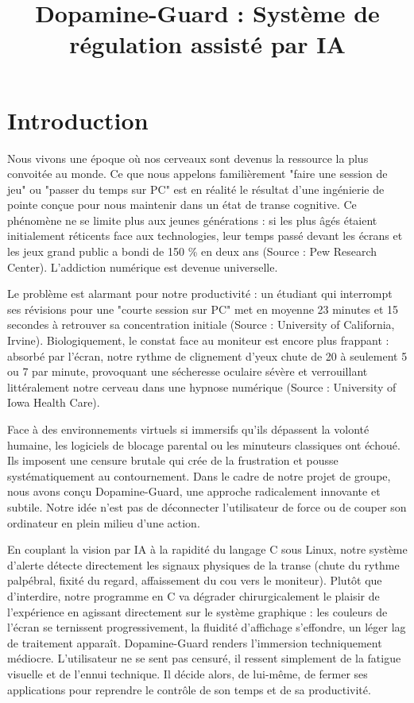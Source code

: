 \documentclass[a4paper, 12pt, twoside]{article}
\title{Dopamine-Guard : Système de régulation assisté par IA}
\begin{document}
\pagedegarde


\tableofcontents
\newpage

\section{Introduction}
Nous vivons une époque où nos cerveaux sont devenus la ressource la plus convoitée au monde. Ce que nous appelons familièrement "faire une session de jeu" ou "passer du temps sur PC" est en réalité le résultat d'une ingénierie de pointe conçue pour nous maintenir dans un état de transe cognitive. Ce phénomène ne se limite plus aux jeunes générations : si les plus âgés étaient initialement réticents face aux technologies, leur temps passé devant les écrans et les jeux grand public a bondi de 150 \% en deux ans (Source : Pew Research Center). L’addiction numérique est devenue universelle.


Le problème est alarmant pour notre productivité : un étudiant qui interrompt ses révisions pour une "courte session sur PC" met en moyenne 23 minutes et 15 secondes à retrouver sa concentration initiale (Source : University of California, Irvine). Biologiquement, le constat face au moniteur est encore plus frappant : absorbé par l'écran, notre rythme de clignement d'yeux chute de 20 à seulement 5 ou 7 par minute, provoquant une sécheresse oculaire sévère et verrouillant littéralement notre cerveau dans une hypnose numérique (Source : University of Iowa Health Care).

Face à des environnements virtuels si immersifs qu'ils dépassent la volonté humaine, les logiciels de blocage parental ou les minuteurs classiques ont échoué. Ils imposent une censure brutale qui crée de la frustration et pousse systématiquement au contournement. Dans le cadre de notre projet de groupe, nous avons conçu Dopamine-Guard, une approche radicalement innovante et subtile. Notre idée n’est pas de déconnecter l’utilisateur de force ou de couper son ordinateur en plein milieu d'une action.

En couplant la vision par IA à la rapidité du langage C sous Linux, notre système d'alerte détecte directement les signaux physiques de la transe (chute du rythme palpébral, fixité du regard, affaissement du cou vers le moniteur). Plutôt que d'interdire, notre programme en C va dégrader chirurgicalement le plaisir de l'expérience en agissant directement sur le système graphique : les couleurs de l'écran se ternissent progressivement, la fluidité d'affichage s'effondre, un léger lag de traitement apparaît. Dopamine-Guard renders l'immersion techniquement médiocre. L'utilisateur ne se sent pas censuré, il ressent simplement de la fatigue visuelle et de l'ennui technique. Il décide alors, de lui-même, de fermer ses applications pour reprendre le contrôle de son temps et de sa productivité.
\end{document}
